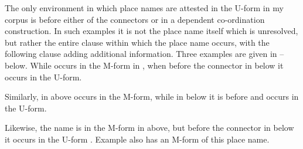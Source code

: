 The only environment in which place names are attested in the U-form in my corpus
is before either of the connectors  or 
in a dependent co-ordination construction.
In such examples it is not the place name itself which is unresolved,
but rather the entire clause within which the place name occurs,
with the following clause adding additional information.
Three examples are given in -- below.
While  occurs in the M-form in ,
when before the connector  in 
below it occurs in the U-form.

\begin{exe}
	\label{ex:130914-3, 0.23}
\end{exe}

Similarly, in  above  occurs in the M-form,
while in  below it is before  and occurs in the U-form.

\begin{exe}
		\label{ex:130907-3, 4.41-4.45}
\end{exe}

Likewise, the name  is in the M-form in  above,
but before the connector  in  below
it occurs in the U-form .
Example  also has an M-form of this place name.

